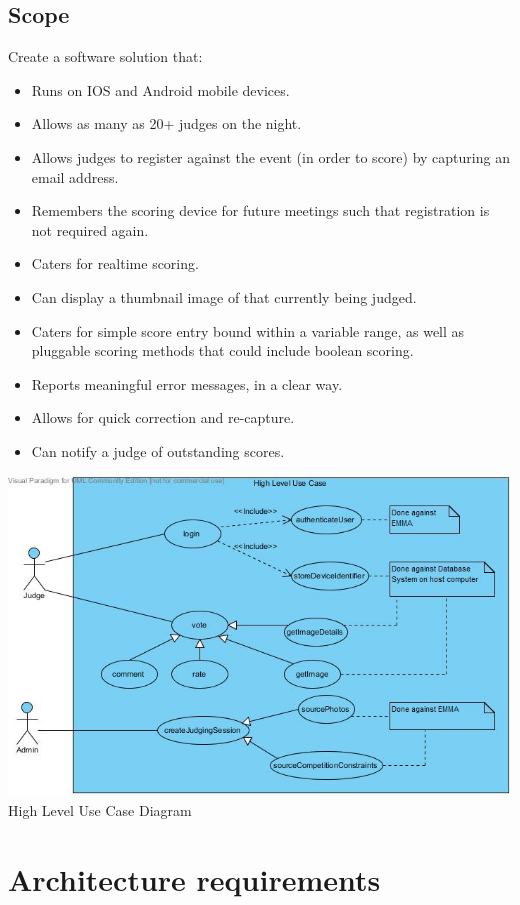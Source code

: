 \documentclass[10pt,a4paper]{article}
\begin{document}
\subsection{Scope}
Create a software solution that:
\begin{itemize}
\item Runs on IOS and Android mobile devices.
\item Allows as many as 20+ judges on the night.
\item Allows judges to register against the event (in order to score) by capturing an email address.
\item Remembers the scoring device for future meetings such that registration is not required again.
\item Caters for realtime scoring.
\item Can display a thumbnail image of that currently being judged.
\item Caters for simple score entry bound within a variable range, as well as pluggable scoring methods that could include boolean scoring.
\item Reports meaningful error messages, in a clear way.
\item Allows for quick correction and re-capture.
\item Can notify a judge of outstanding scores.
\end{itemize}

\begin{center}
\advance\leftskip-2cm
\includegraphics[width=160mm]{Pictures/HighLevelUseCase.jpg} 
High Level Use Case Diagram
\end{center}

\pagebreak
\section{Architecture requirements}
\end{document}
